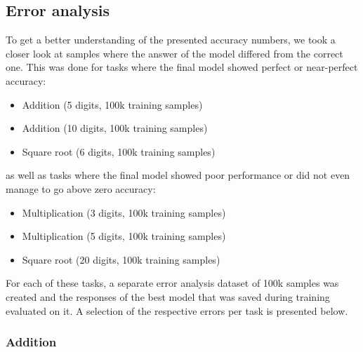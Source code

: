 

\subsection{Error analysis}
\label{error_analysis}

To get a better understanding of the presented accuracy numbers, we took a closer look at samples where the answer of the model differed from the correct one. This was done for tasks where the final model showed perfect or near-perfect accuracy:

\begin{itemize}
    \item Addition (5 digits, 100k training samples)
    \item Addition (10 digits, 100k training samples)
    \item Square root (6 digits, 100k training samples)
\end{itemize}

as well as tasks where the final model showed poor performance or did not even manage to go above zero accuracy:

\begin{itemize}
    \item Multiplication (3 digits, 100k training samples)
    \item Multiplication (5 digits, 100k training samples)
    \item Square root (20 digits, 100k training samples)
\end{itemize}

For each of these tasks, a separate error analysis dataset of 100k samples was created and the responses of the best model that was saved during training evaluated on it. A selection of the respective errors per task is presented below.

\subsubsection{Addition}

